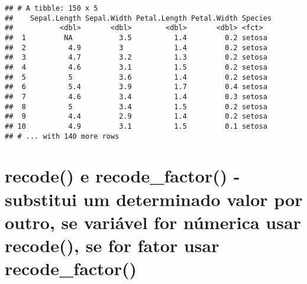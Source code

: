 \documentclass[]{book}
\newenvironment{Shaded}{\begin{snugshade}}{\end{snugshade}}
\newcommand{\DataTypeTok}[1]{\textcolor[rgb]{0.13,0.29,0.53}{#1}}
\newcommand{\DecValTok}[1]{\textcolor[rgb]{0.00,0.00,0.81}{#1}}
\newcommand{\FloatTok}[1]{\textcolor[rgb]{0.00,0.00,0.81}{#1}}
\newcommand{\KeywordTok}[1]{\textcolor[rgb]{0.13,0.29,0.53}{\textbf{#1}}}
\newcommand{\NormalTok}[1]{#1}
\newcommand{\OperatorTok}[1]{\textcolor[rgb]{0.81,0.36,0.00}{\textbf{#1}}}
\newcommand{\StringTok}[1]{\textcolor[rgb]{0.31,0.60,0.02}{#1}}
\begin{document}
\begin{Shaded}
\end{Shaded}

\begin{verbatim}
## # A tibble: 150 x 5
##    Sepal.Length Sepal.Width Petal.Length Petal.Width Species
##           <dbl>       <dbl>        <dbl>       <dbl> <fct>  
##  1         NA           3.5          1.4         0.2 setosa 
##  2          4.9         3            1.4         0.2 setosa 
##  3          4.7         3.2          1.3         0.2 setosa 
##  4          4.6         3.1          1.5         0.2 setosa 
##  5          5           3.6          1.4         0.2 setosa 
##  6          5.4         3.9          1.7         0.4 setosa 
##  7          4.6         3.4          1.4         0.3 setosa 
##  8          5           3.4          1.5         0.2 setosa 
##  9          4.4         2.9          1.4         0.2 setosa 
## 10          4.9         3.1          1.5         0.1 setosa 
## # ... with 140 more rows
\end{verbatim}

\hypertarget{recode-e-recode_factor---substitui-um-determinado-valor-por-outro-se-variuxe1vel-for-nuxfamerica-usar-recode-se-for-fator-usar-recode_factor}{%
\section{recode() e recode\_factor() - substitui um determinado valor por outro, se variável for númerica usar recode(), se for fator usar recode\_factor()}\label{recode-e-recode_factor---substitui-um-determinado-valor-por-outro-se-variuxe1vel-for-nuxfamerica-usar-recode-se-for-fator-usar-recode_factor}}

\begin{Shaded}
\end{Shaded}
\end{document}
